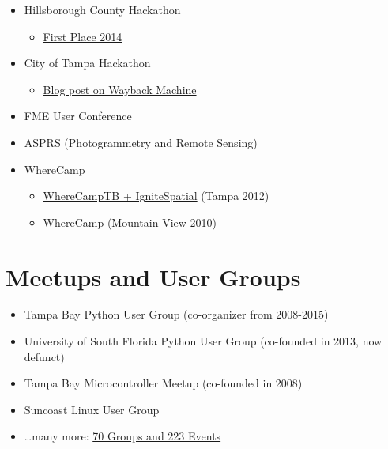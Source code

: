 \documentclass[12pt]{article}
\newenvironment{mitemize}
               {%
                 \setlength{\parskip}{3pt}
                 \setlength{\itemsep}{2.5pt plus 1pt}
                 \begin{itemize}}
               {\end{itemize}}
\begin{document}
\begin{mitemize}
\begin{mitemize}
    \item Sarasota 2011, Orlando, Portland, \ldots more
  \end{mitemize}
\item Hillsborough County Hackathon
  \begin{mitemize}
    \item \href{https://hscweb3.hsc.usf.edu/health/publichealth/news/global-health-has-1-hacker/}{First Place 2014}
  \end{mitemize}
\item City of Tampa Hackathon
  \begin{mitemize}
    \item \href{https://web.archive.org/web/20120808120046/http://www.weogeo.com/blog/City_of_Tampa_Mayors_Hackathon.html}{Blog post on Wayback Machine}
  \end{mitemize}
\item FME User Conference
\item ASPRS (Photogrammetry and Remote Sensing)
\item WhereCamp
  \begin{mitemize}
    \item \href{http://gisuser.com/2011/12/wherecamptb-ignitespatial-feb-10-11-tampa-fl/}{WhereCampTB + IgniteSpatial} (Tampa 2012)
    \item \href{https://conferences.oreilly.com/where/where2010/public/schedule/detail/14268}{WhereCamp} (Mountain View 2010)
  \end{mitemize}
\end{mitemize}

\section*{Meetups and User Groups} \hfill

\begin{mitemize}
\item Tampa Bay Python User Group (co-organizer from 2008-2015)
\item University of South Florida Python User Group (co-founded in 2013, now defunct)
\item Tampa Bay Microcontroller Meetup (co-founded in 2008)
\item Suncoast Linux User Group
\item \ldots many more: \href{https://www.meetup.com/members/4129281/}{70 Groups and 223 Events}
\end{mitemize}
\end{document}
